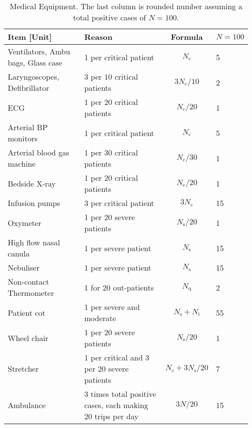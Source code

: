 \documentclass{article}
\newcommand{\nc}{\ensuremath{N_{\mathrm{c}}}}
\newcommand{\ns}{\ensuremath{N_{\mathrm{s}}}}
\newcommand{\nin}{\ensuremath{N_{\mathrm{i}}}}
\newcommand{\nq}{\ensuremath{N_{\mathrm{q}}}}
\begin{document}
\begin{landscape}
\begin{table}
  \caption{Medical Equipment. The last column is
    rounded number assuming a total positive cases of $N=100$.}
  \begin{tabularx}{\linewidth}{XXcl}
    \toprule
    Item [Unit] & Reason & Formula & $N=100$\\
    \midrule
    Ventilators, Ambu bags, Glass case & 1 per critical patient&
    $\nc$ & 5 \\
    Laryngoscopes, Defibrillator & 3 per 10 critical patients &
    $3 \nc/10$ & 2 \\
    ECG & 1 per 20 critical patients& $\nc/20$ & 1\\
    Arterial BP monitors & 1 per critical patient &
    $\nc$ & 5 \\
    Arterial blood gas machine & 1 per 30 critical patients &
    $\nc/30$ & 1 \\
    Bedside X-ray & 1 per 20 critical patients & $\nc/20$ & 1\\
    Infusion pumps & 3 per critical patient & $3 \nc$ & 15 \\
    Oxymeter &  1 per 20 severe patients & $\ns/20$ & 1\\
    High flow nasal canula & 1 per severe patient & $\ns$ & 15\\
    Nebuliser & 1 per severe patient & $\ns$ & 15\\
    Non-contact Thermometer & 1 for 20 out-patients & $\nq$ & 2\\
    Patient cot & 1 per severe and moderate & $\ns+\nin$ & 55 \\
    Wheel chair & 1 per 20 severe patients & $\ns/20$ & 1\\
    Stretcher & 1 per critical and 3 per 20 severe patients &
    $\nc + 3 \ns/20$ & 7\\
    Ambulance &  3 times total positive cases, each making 20 trips
    per day & $3 N / 20$ & 15\\
\bottomrule
\end{tabularx}
\end{table}
\end{landscape}
\end{document}

